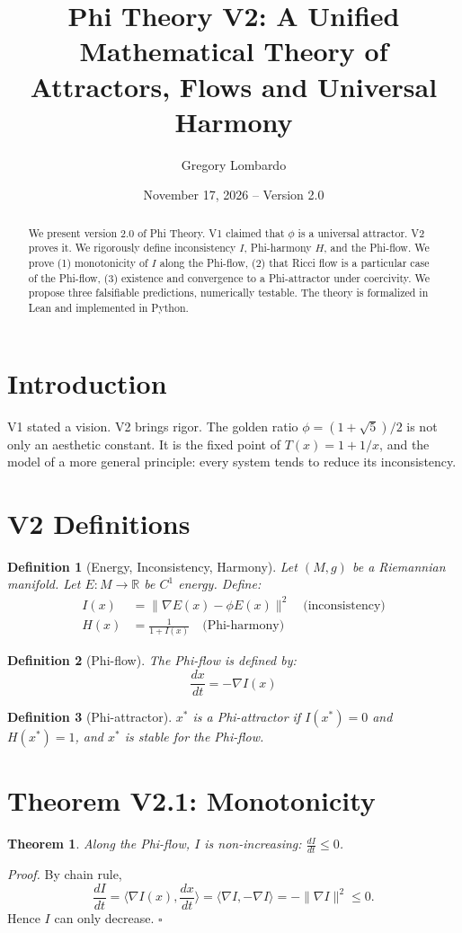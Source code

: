 \documentclass[11pt,a4paper]{article}
\title{Phi Theory V2: A Unified Mathematical Theory of Attractors, Flows and Universal Harmony}
\author{Gregory Lombardo}
\date{November 17, 2026 -- Version 2.0}
\newtheorem{definition}{Definition}[section]
\newtheorem{theorem}{Theorem}[section]
\begin{document}
\maketitle
\begin{abstract}
We present version 2.0 of Phi Theory. V1 claimed that $\phi$ is a universal attractor. V2 proves it. We rigorously define inconsistency $I$, Phi-harmony $H$, and the Phi-flow. We prove (1) monotonicity of $I$ along the Phi-flow, (2) that Ricci flow is a particular case of the Phi-flow, (3) existence and convergence to a Phi-attractor under coercivity. We propose three falsifiable predictions, numerically testable. The theory is formalized in Lean and implemented in Python.
\end{abstract}

\section{Introduction}
V1 stated a vision. V2 brings rigor. The golden ratio $\phi = (1+\sqrt{5})/2$ is not only an aesthetic constant. It is the fixed point of $T(x)=1+1/x$, and the model of a more general principle: every system tends to reduce its inconsistency.

\section{V2 Definitions}
\begin{definition}[Energy, Inconsistency, Harmony]
Let $(M,g)$ be a Riemannian manifold. Let $E:M\to\mathbb{R}$ be $C^1$ energy. Define:
\begin{align*}
I(x) &= \|\nabla E(x) - \phi E(x)\|^2 \quad \text{(inconsistency)} \\
H(x) &= \frac{1}{1+I(x)} \quad \text{(Phi-harmony)}
\end{align*}
\end{definition}
\begin{definition}[Phi-flow]
The Phi-flow is defined by:
\[
\frac{dx}{dt} = -\nabla I(x)
\]
\end{definition}
\begin{definition}[Phi-attractor]
$x^*$ is a Phi-attractor if $I(x^*)=0$ and $H(x^*)=1$, and $x^*$ is stable for the Phi-flow.
\end{definition}

\section{Theorem V2.1: Monotonicity}
\begin{theorem}
Along the Phi-flow, $I$ is non-increasing: $\frac{dI}{dt} \leq 0$.
\end{theorem}
\textit{Proof.} By chain rule,
\[
\frac{dI}{dt} = \langle \nabla I(x), \frac{dx}{dt}\rangle = \langle \nabla I, -\nabla I\rangle = -\|\nabla I\|^2 \leq 0.
\]
Hence $I$ can only decrease. $\square$
\end{document}
